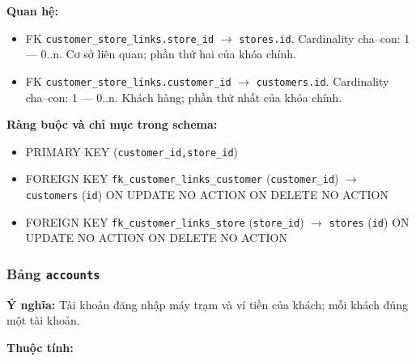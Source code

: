 \textbf{Quan hệ:}

\begin{itemize}

\item FK \texttt{customer\_store\_links.store\_id} $\rightarrow$ \texttt{stores.id}. Cardinality cha--con: 1 — 0..n. Cơ sở liên quan; phần thứ hai của khóa chính.

\item FK \texttt{customer\_store\_links.customer\_id} $\rightarrow$ \texttt{customers.id}. Cardinality cha--con: 1 — 0..n. Khách hàng; phần thứ nhất của khóa chính.

\end{itemize}

\textbf{Ràng buộc và chỉ mục trong schema:}

\begin{itemize}

\item PRIMARY KEY (\texttt{customer\_id,store\_id})

\item FOREIGN KEY \texttt{fk\_customer\_links\_customer} (\texttt{customer\_id}) $\rightarrow$ \texttt{customers} (\texttt{id}) ON UPDATE NO ACTION ON DELETE NO ACTION

\item FOREIGN KEY \texttt{fk\_customer\_links\_store} (\texttt{store\_id}) $\rightarrow$ \texttt{stores} (\texttt{id}) ON UPDATE NO ACTION ON DELETE NO ACTION

\end{itemize}

\subsubsection{Bảng \texttt{accounts}}

\textbf{Ý nghĩa:} Tài khoản đăng nhập máy trạm và ví tiền của khách; mỗi khách đúng một tài khoản.\par

\textbf{Thuộc tính:}

